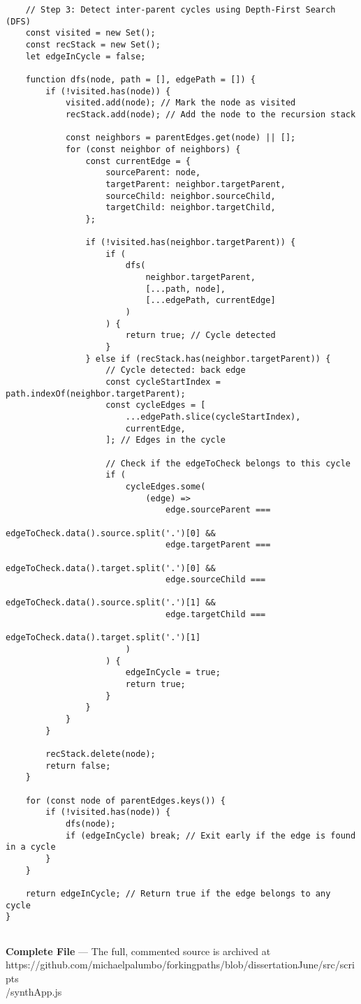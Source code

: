 \begin{lstlisting}
    // Step 3: Detect inter-parent cycles using Depth-First Search (DFS)
    const visited = new Set();
    const recStack = new Set();
    let edgeInCycle = false;

    function dfs(node, path = [], edgePath = []) {
        if (!visited.has(node)) {
            visited.add(node); // Mark the node as visited
            recStack.add(node); // Add the node to the recursion stack

            const neighbors = parentEdges.get(node) || [];
            for (const neighbor of neighbors) {
                const currentEdge = {
                    sourceParent: node,
                    targetParent: neighbor.targetParent,
                    sourceChild: neighbor.sourceChild,
                    targetChild: neighbor.targetChild,
                };

                if (!visited.has(neighbor.targetParent)) {
                    if (
                        dfs(
                            neighbor.targetParent,
                            [...path, node],
                            [...edgePath, currentEdge]
                        )
                    ) {
                        return true; // Cycle detected
                    }
                } else if (recStack.has(neighbor.targetParent)) {
                    // Cycle detected: back edge
                    const cycleStartIndex = path.indexOf(neighbor.targetParent);
                    const cycleEdges = [
                        ...edgePath.slice(cycleStartIndex),
                        currentEdge,
                    ]; // Edges in the cycle

                    // Check if the edgeToCheck belongs to this cycle
                    if (
                        cycleEdges.some(
                            (edge) =>
                                edge.sourceParent ===
                                    edgeToCheck.data().source.split('.')[0] &&
                                edge.targetParent ===
                                    edgeToCheck.data().target.split('.')[0] &&
                                edge.sourceChild ===
                                    edgeToCheck.data().source.split('.')[1] &&
                                edge.targetChild ===
                                    edgeToCheck.data().target.split('.')[1]
                        )
                    ) {
                        edgeInCycle = true;
                        return true;
                    }
                }
            }
        }

        recStack.delete(node);
        return false;
    }

    for (const node of parentEdges.keys()) {
        if (!visited.has(node)) {
            dfs(node);
            if (edgeInCycle) break; // Exit early if the edge is found in a cycle
        }
    }

    return edgeInCycle; // Return true if the edge belongs to any cycle
}


\end{lstlisting}






\bigskip
\textbf{Complete File} — The full, commented source is archived at
\\https://github.com/michaelpalumbo/forkingpaths/blob/dissertationJune/src/scripts\\/synthApp.js